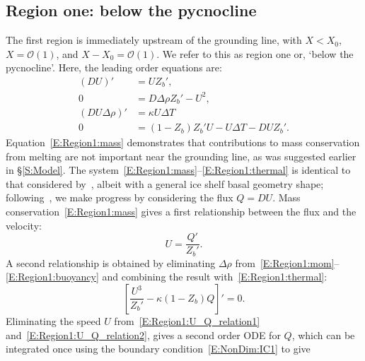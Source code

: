 \documentclass[openacc]{rsproca_new}%
\newcommand{\dd}[2]{\frac{\mathrm{d} #1}{\mathrm{d} #2}}
\newcommand{\order}[1]{\mathcal{O}(#1)}
\begin{document}
\subsection{Region one: below the pycnocline}\label{S:Asymptotics:Region1}
The first region is immediately upstream of the grounding line,  with $X  <  X_0$,  $X= \order{1}$, and $X - X_0 = \mathcal{O}(1)$. We refer to this as region one or, `below the pycnocline'. Here, the leading order equations are:
\begin{align}
(DU)' &= U Z_b',\label{E:Region1:mass}\\
0 &= D \Delta \rho Z_b' - U^2, \label{E:Region1:mom}\\
(DU\Delta \rho)'  &=\kappa U \Delta T\label{E:Region1:buoyancy}\\
0&= (1  - Z_b)Z_b' U- U\Delta T - DU Z_b'.\label{E:Region1:thermal}
\end{align}
Equation~\eqref{E:Region1:mass} demonstrates that contributions to mass conservation from melting are not important near the grounding line, as was suggested earlier in \S\ref{S:Model}. 
The system~\eqref{E:Region1:mass}--\eqref{E:Region1:thermal} is identical to that considered by~\cite{Lazeroms2019JPhysOcean}, albeit with a general ice shelf basal geometry shape; following~\cite{Lazeroms2019JPhysOcean}, we make progress by considering the flux $Q= DU$. Mass conservation~\eqref{E:Region1:mass} gives a first relationship between the flux and the velocity:
\begin{equation}\label{E:Region1:U_Q_relation1}
U = \frac{Q'}{Z_b'}.
\end{equation}
A second relationship is obtained by eliminating $\Delta \rho$ from~\eqref{E:Region1:mom}--\eqref{E:Region1:buoyancy} and combining the result with~\eqref{E:Region1:thermal}:
\begin{equation}\label{E:Region1:U_Q_relation2}
\left[\frac{U^3}{Z_b'} - \kappa (1 - Z_b)Q\right]' = 0.
\end{equation}
Eliminating the speed $U$ from~\eqref{E:Region1:U_Q_relation1} and~\eqref{E:Region1:U_Q_relation2}, gives a second order ODE for $Q$, which can be integrated once using the boundary condition~\eqref{E:NonDim:IC1} to give
\end{document}
